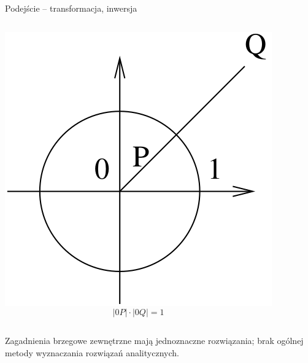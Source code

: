 \begin{frame}
  Podejście -- transformacja, inwersja
  \begin{columns}
      \includegraphics[width = \linewidth]{img/23/inwersja}
      $$|0P| \cdot |0Q| = 1$$
  \end{columns}

  \vspace{5px}

  Zagadnienia brzegowe zewnętrzne mają jednoznaczne rozwiązania; brak ogólnej metody wyznaczania rozwiązań analitycznych.
\end{frame}
